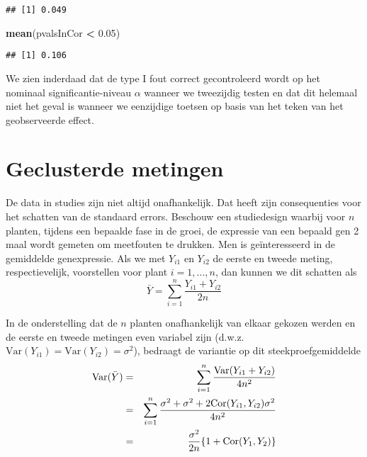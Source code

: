\documentclass[
  12pt,dutch,coursenotes]{book}
\newenvironment{Shaded}{\begin{snugshade}}{\end{snugshade}}
\newcommand{\FloatTok}[1]{\textcolor[rgb]{0.00,0.00,0.81}{#1}}
\newcommand{\KeywordTok}[1]{\textcolor[rgb]{0.13,0.29,0.53}{\textbf{#1}}}
\newcommand{\NormalTok}[1]{#1}
\newcommand{\OperatorTok}[1]{\textcolor[rgb]{0.81,0.36,0.00}{\textbf{#1}}}
\newcommand{\StringTok}[1]{\textcolor[rgb]{0.31,0.60,0.02}{#1}}
\theoremstyle{definition}
\theoremstyle{definition}
\theoremstyle{definition}
\theoremstyle{remark}
\begin{document}
\begin{verbatim}
## [1] 0.049
\end{verbatim}

\begin{Shaded}
\begin{Highlighting}[]
\KeywordTok{mean}\NormalTok{(pvalsInCor }\OperatorTok{\textless{}}\StringTok{ }\FloatTok{0.05}\NormalTok{)}
\end{Highlighting}
\end{Shaded}

\begin{verbatim}
## [1] 0.106
\end{verbatim}

We zien inderdaad dat de type I fout correct gecontroleerd wordt op het nominaal significantie-niveau \(\alpha\) wanneer we tweezijdig testen en dat dit helemaal niet het geval is wanneer we eenzijdige toetsen op basis van het teken van het geobserveerde effect.

\hypertarget{geclusterde-metingen}{%
\section{Geclusterde metingen}\label{geclusterde-metingen}}

De data in studies zijn niet altijd onafhankelijk. Dat heeft zijn consequenties voor het schatten van de standaard errors.
Beschouw een studiedesign waarbij voor \(n\) planten, tijdens een bepaalde fase in de groei, de expressie van een bepaald gen 2 maal wordt gemeten om meetfouten te drukken. Men is geïnteresseerd in de gemiddelde genexpressie.
Als we met \(Y_{i1}\) en \(Y_{i2}\) de eerste en tweede meting, respectievelijk, voorstellen
voor plant \(i=1,...,n\), dan kunnen we dit schatten als
\begin{equation*}
\bar Y = \sum_{i=1}^n \frac{Y_{i1}+Y_{i2}}{2n}
\end{equation*}

In de onderstelling dat de \(n\) planten onafhankelijk van elkaar gekozen
werden en de eerste en tweede metingen even variabel zijn (d.w.z. \(\text{Var}(Y_{i1})=\text{Var}(Y_{i2})=\sigma^2\)), bedraagt de variantie op dit
steekproefgemiddelde
\begin{eqnarray*}
\text{Var}(\bar Y)&=&\sum_{i=1}^n \frac{\text{Var}(Y_{i1}+Y_{i2})}{4n^2} \\
&=&\sum_{i=1}^n \frac{\sigma^2+\sigma^2+2\text{Cor}(Y_{i1},Y_{i2})\sigma^2}{%
4n^2} \\
&=&\frac{\sigma^2}{2n}\{1+\text{Cor}(Y_{1},Y_{2})\}
\end{eqnarray*}
\end{document}
